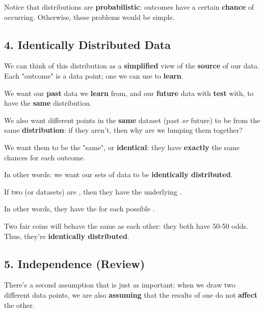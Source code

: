         Notice that distributions are \textbf{probabilistic}: outcomes have a certain \textbf{chance} of occurring. Otherwise, these problems would be simple.

\pagebreak

    \subsection*{4. Identically Distributed Data}
        
        We can think of this distribution as a \textbf{simplified} view of the \textbf{source} of our data. Each "outcome" is a data point; one we can use to \textbf{learn}.
        
        We want our \textbf{past} data we \textbf{learn} from, and our \textbf{future} data with \textbf{test} with, to have the \textbf{same} distribution.
        
        We also want different points in the \textbf{same} dataset (past \textit{or} future) to be from the same \textbf{distribution}: if they aren't, then why are we lumping them together? 
        
        We want them to be the "same", or \textbf{identical}: they have \textbf{exactly} the same chances for each outcome.
        
        In other words: we want our sets of data to be \textbf{identically distributed}.\\
        
        \begin{definition}
            If two (or datasets) are , then they have the  underlying .
            
            In other words, they have the   for each possible .
        \end{definition}
        
        \miniex Two fair coins will behave the same as each other: they both have 50-50 odds. Thus, they're \textbf{identically distributed}.
        
        
    \subsection*{5. Independence (Review)}
        
        There's a second assumption that is just as important: when we draw two different data points, we are also \textbf{assuming} that the results of one do not \textbf{affect} the other. 
        
